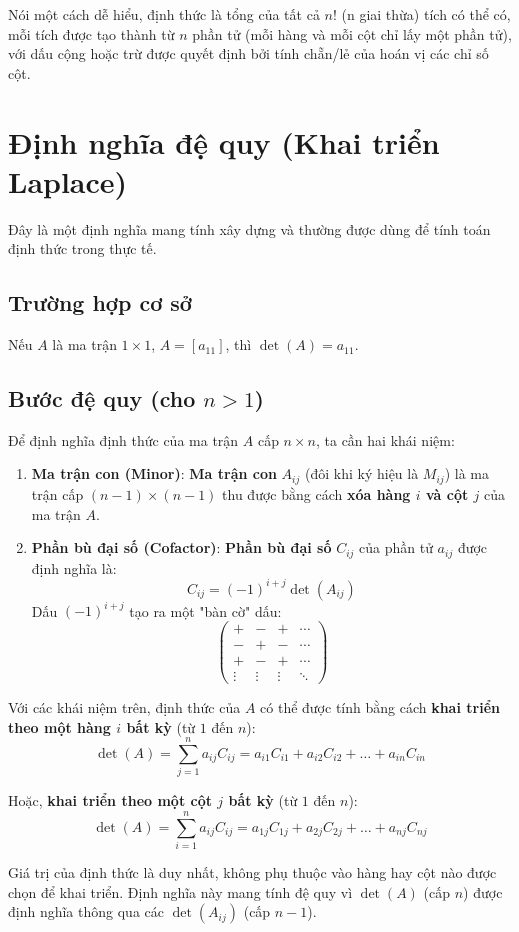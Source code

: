 Nói một cách dễ hiểu, định thức là tổng của tất cả $n!$ (n giai thừa) tích có thể có, mỗi tích được tạo thành từ $n$ phần tử (mỗi hàng và mỗi cột chỉ lấy một phần tử), với dấu cộng hoặc trừ được quyết định bởi tính chẵn/lẻ của hoán vị các chỉ số cột.

\section{Định nghĩa đệ quy (Khai triển Laplace)}

Đây là một định nghĩa mang tính xây dựng và thường được dùng để tính toán định thức trong thực tế.

\subsection*{Trường hợp cơ sở}
Nếu $A$ là ma trận $1 \times 1$, $A = [a_{11}]$, thì $\det(A) = a_{11}$.

\subsection*{Bước đệ quy (cho $n > 1$)}
Để định nghĩa định thức của ma trận $A$ cấp $n \times n$, ta cần hai khái niệm:

\begin{enumerate}
    \item \textbf{Ma trận con (Minor)}: \textbf{Ma trận con} $A_{ij}$ (đôi khi ký hiệu là $M_{ij}$) là ma trận cấp $(n-1) \times (n-1)$ thu được bằng cách \textbf{xóa hàng $i$ và cột $j$} của ma trận $A$.
    
    \item \textbf{Phần bù đại số (Cofactor)}: \textbf{Phần bù đại số} $C_{ij}$ của phần tử $a_{ij}$ được định nghĩa là:
    $$ C_{ij} = (-1)^{i+j} \det(A_{ij}) $$
    Dấu $(-1)^{i+j}$ tạo ra một "bàn cờ" dấu:
    $$ \begin{pmatrix}
    + & - & + & \cdots \\
    - & + & - & \cdots \\
    + & - & + & \cdots \\
    \vdots & \vdots & \vdots & \ddots
    \end{pmatrix} $$
\end{enumerate}

Với các khái niệm trên, định thức của $A$ có thể được tính bằng cách \textbf{khai triển theo một hàng $i$ bất kỳ} (từ $1$ đến $n$):
$$ \det(A) = \sum_{j=1}^{n} a_{ij} C_{ij} = a_{i1}C_{i1} + a_{i2}C_{i2} + \dots + a_{in}C_{in} $$

Hoặc, \textbf{khai triển theo một cột $j$ bất kỳ} (từ $1$ đến $n$):
$$ \det(A) = \sum_{i=1}^{n} a_{ij} C_{ij} = a_{1j}C_{1j} + a_{2j}C_{2j} + \dots + a_{nj}C_{nj} $$

Giá trị của định thức là duy nhất, không phụ thuộc vào hàng hay cột nào được chọn để khai triển. Định nghĩa này mang tính đệ quy vì $\det(A)$ (cấp $n$) được định nghĩa thông qua các $\det(A_{ij})$ (cấp $n-1$).

